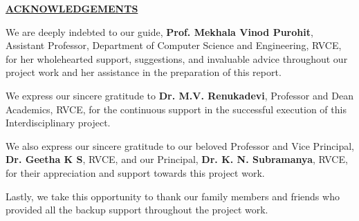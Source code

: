\thispagestyle{empty}
\ifIDP \vspace{-1cm}\fi
\begin{center}
	\Large\textbf{\underline{ACKNOWLEDGEMENTS}} \par
\end{center}

\noindent We are deeply indebted to our guide, \textbf{Prof. Mekhala Vinod Purohit}, Assistant Professor, Department of Computer Science and Engineering, RVCE, for her wholehearted support, suggestions, and invaluable advice throughout our project work and her assistance in the preparation of this report.\\ \par

\noindent We express our sincere gratitude to \textbf{Dr. M.V. Renukadevi}, Professor and Dean Academics, RVCE, for the continuous support in the successful execution of this Interdisciplinary project.\\ \par

\noindent We also express our sincere gratitude to our beloved Professor and Vice Principal, \textbf{Dr. Geetha K S}, RVCE, and our Principal, \textbf{Dr. K. N. Subramanya}, RVCE, for their appreciation and support towards this project work.\\ \par

\noindent Lastly, we take this opportunity to thank our family members and friends who provided all the backup support throughout the project work.\\ \par